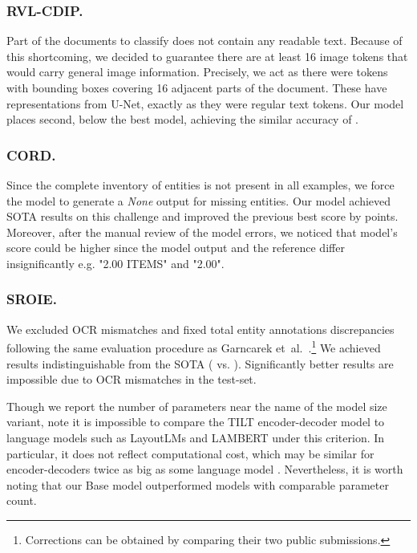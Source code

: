 \documentclass[runningheads]{llncs}
\begin{document}
\subsubsection{RVL-CDIP.}
Part of the documents to classify does not contain any readable text.
Because of this shortcoming, we decided to guarantee there are at least 16 image tokens that would carry general image information.
Precisely, we act as there were tokens with bounding boxes covering 16 adjacent parts of the document. These have representations from U-Net, exactly as they were regular text tokens. Our model places second,  below the best model, achieving the similar accuracy of . 



\subsubsection{CORD.}
Since the complete inventory of entities is not present in all examples, we force the model to generate a \textit{None} output for missing entities.
Our model achieved SOTA results on this challenge and improved the previous best score by  points.
Moreover, after the manual review of the model errors, we noticed that model's score could be higher since the model output and the reference differ insignificantly e.g. "2.00 ITEMS" and "2.00".

\subsubsection{SROIE.}
We excluded OCR mismatches and fixed total entity annotations discrepancies following the same evaluation procedure as Garncarek et~al.~\cite{garncarek2020lambert}.\footnote{Corrections can be obtained by comparing their two public submissions.} We achieved results indistinguishable from the SOTA ( vs. ). Significantly better results are impossible due to OCR mismatches in the test-set.

\bigskip\noindent Though we report the number of parameters near the name of the model size variant, note it is impossible to compare the TILT encoder-decoder model to language models such as LayoutLMs and LAMBERT under this criterion. In particular, it does not reflect computational cost, which may be similar for encoder-decoders twice as big as some language model \cite[Section 3.2.2]{2020t5}. Nevertheless, it is worth noting that our Base model outperformed models with comparable parameter count.
\end{document}
